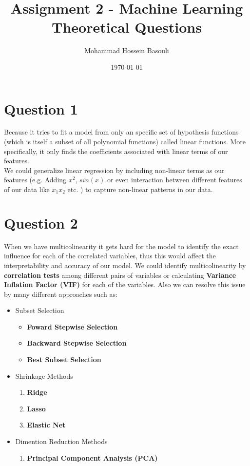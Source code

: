 \documentclass[a4paper,12pt]{article}
\begin{document}
\title{Assignment 2 - Machine Learning \\
Theoretical Questions}
\author{Mohammad Hossein Basouli}
\date{\today}
\maketitle

\section*{Question 1}
Because it tries to fit a model from only an specific set of hypothesis functions (which is itself a subset of all polynomial functions) called linear functions. More specifically, 
it only finds the coefficients associated with linear terms of our features. \\ 
We could generalize linear regression by including non-linear terms as our features (e.g. Adding $ x^2 $, $ sin(x) $ or even interaction between different features of our data like $x_1x_2$ etc. ) 
to capture non-linear patterns in our data.

\section*{Question 2}
When we have multicolinearity it gets hard for the model to identify the exact influence for each of the correlated variables, thus this would affect the interpretability and 
accuracy of our model. We could identify multicolinearity by \textbf{correlation tests} among different pairs of variables or calculating \textbf{Variance Inflation Factor (VIF)} 
for each of the variables. Also we can resolve this issue by many different approaches such as:
\begin{itemize}
    \item Subset Selection
    \begin{itemize}
        \item \textbf{Foward Stepwise Selection}
        \item \textbf{Backward Stepwise Selection}
        \item \textbf{Best Subset Selection }
    \end{itemize}
    \item Shrinkage Methods
    \begin{enumerate}
        \item \textbf{Ridge}
        \item \textbf{Lasso}
        \item \textbf{Elastic Net}
    \end{enumerate}
    \item Dimention Reduction Methods
    \begin{enumerate}
        \item \textbf{Principal Component Analysis (PCA)}
    \end{enumerate}
\end{itemize}
\end{document}
